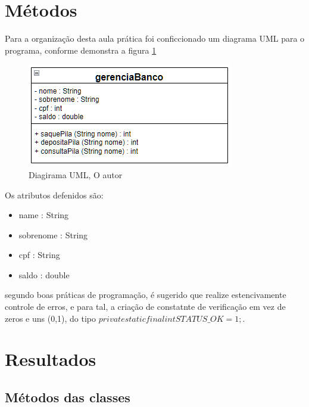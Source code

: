 \section{Métodos}
\par Para a organização desta aula prática foi conficcionado um diagrama UML para o programa, conforme demonstra a figura \ref{fig:uml}

\begin{figure}[h]
  \includegraphics[width=\textwidth]{figure/uml_classe.png}
  \caption{Diagirama UML, O autor}
  \label{fig:uml}
\end{figure}
\newpage
\par Os atributos defenidos são:
\begin{itemize}
  \item name : String
  \item sobrenome : String
  \item cpf : String
  \item saldo : double
\end{itemize}

\par segundo boas práticas de programação, é sugerido que realize estencivamente controle de erros, e para tal, a criação de constatnte de verificação em vez de zeros e uns (0,1), do tipo $private static final int  STATUS\_OK = 1;$.

\section{Resultados}






\subsection{Métodos das classes}

